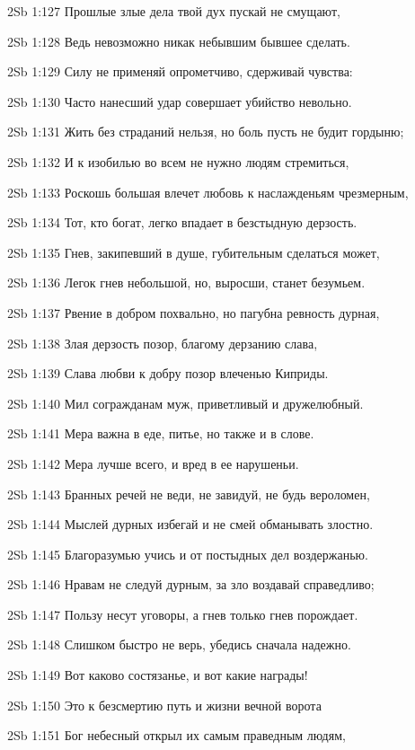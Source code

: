 \vs 2Sb 1:127 Прошлые злые дела твой дух пускай не смущают,

\vs 2Sb 1:128 Ведь невозможно никак небывшим бывшее сделать.

\vs 2Sb 1:129 Силу не применяй опрометчиво, сдерживай чувства: 

\vs 2Sb 1:130 Часто нанесший удар совершает убийство невольно.

\vs 2Sb 1:131 Жить без страданий нельзя, но боль пусть не будит гордыню;

\vs 2Sb 1:132 И к изобилью во всем не нужно людям стремиться,

\vs 2Sb 1:133 Роскошь большая влечет любовь к наслажденьям чрезмерным,

\vs 2Sb 1:134 Тот, кто богат, легко впадает в безстыдную дерзость. 

\vs 2Sb 1:135 Гнев, закипевший в душе, губительным сделаться может,

\vs 2Sb 1:136 Легок гнев небольшой, но, выросши, станет безумьем.

\vs 2Sb 1:137 Рвение в добром похвально, но пагубна ревность дурная,

\vs 2Sb 1:138 Злая дерзость  позор, благому дерзанию  слава,

\vs 2Sb 1:139 Слава любви к добру  позор влеченью Киприды. 

\vs 2Sb 1:140 Мил согражданам муж, приветливый и дружелюбный.

\vs 2Sb 1:141 Мера важна в еде, питье, но также и в слове.

\vs 2Sb 1:142 Мера  лучше всего, и вред в ее нарушеньи.

\vs 2Sb 1:143 Бранных речей не веди, не завидуй, не будь вероломен,

\vs 2Sb 1:144 Мыслей дурных избегай и не смей обманывать злостно. 

\vs 2Sb 1:145 Благоразумью учись и от постыдных дел воздержанью.

\vs 2Sb 1:146 Нравам не следуй дурным, за зло воздавай справедливо;

\vs 2Sb 1:147 Пользу несут уговоры, а гнев только гнев порождает.

\vs 2Sb 1:148 Слишком быстро не верь, убедись сначала надежно.

\vs 2Sb 1:149 Вот каково состязанье, и вот какие награды! 

\vs 2Sb 1:150 Это к безсмертию путь и жизни вечной ворота  

\vs 2Sb 1:151 Бог небесный открыл их самым праведным людям, 

